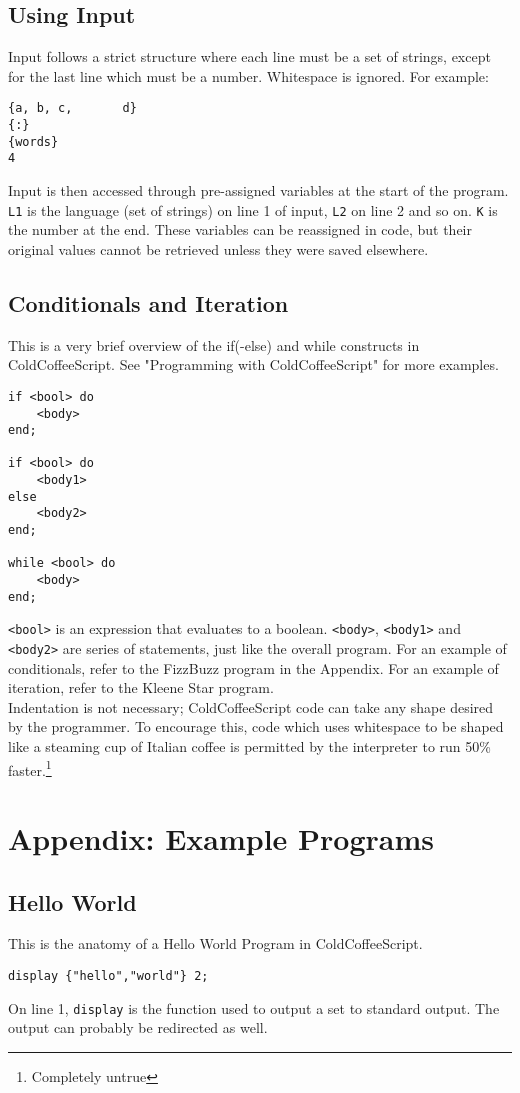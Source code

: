 \documentclass{article}
\begin{document}
\subsection{Using Input}
Input follows a strict structure where each line must be a set of strings, except for the last line which must be a number. Whitespace is ignored. For example:
\begin{lstlisting}
{a, b, c,       d}
{:}
{words}
4
\end{lstlisting}
Input is then accessed through pre-assigned variables at the start of the program. \lstinline|L1| is the language (set of strings) on line 1 of input, \lstinline|L2| on line 2 and so on. \lstinline|K| is the number at the end. These variables can be reassigned in code, but their original values cannot be retrieved unless they were saved elsewhere.
\subsection{Conditionals and Iteration}
This is a very brief overview of the if(-else) and while constructs in ColdCoffeeScript. See "Programming with ColdCoffeeScript" for more examples.
\begin{lstlisting}
if <bool> do
    <body>
end;

if <bool> do
    <body1>
else
    <body2>
end;

while <bool> do
    <body>
end;
\end{lstlisting}
\lstinline|<bool>| is an expression that evaluates to a boolean. \lstinline|<body>|, \lstinline|<body1>| and \lstinline|<body2>| are series of statements, just like the overall program. For an example of conditionals, refer to the FizzBuzz program in the Appendix. For an example of iteration, refer to the Kleene Star program.\\
Indentation is not necessary; ColdCoffeeScript code can take any shape desired by the programmer. To encourage this, code which uses whitespace to be shaped like a steaming cup of Italian coffee is permitted by the interpreter to run 50\% faster.\footnote{Completely untrue}
\section{Appendix: Example Programs}
\subsection{Hello World}
This is the anatomy of a Hello World Program in ColdCoffeeScript.
\begin{lstlisting}
display {"hello","world"} 2;
\end{lstlisting}
On line 1, \lstinline|display| is the function used to output a set to standard output. The output can probably be redirected as well.
\end{document}
